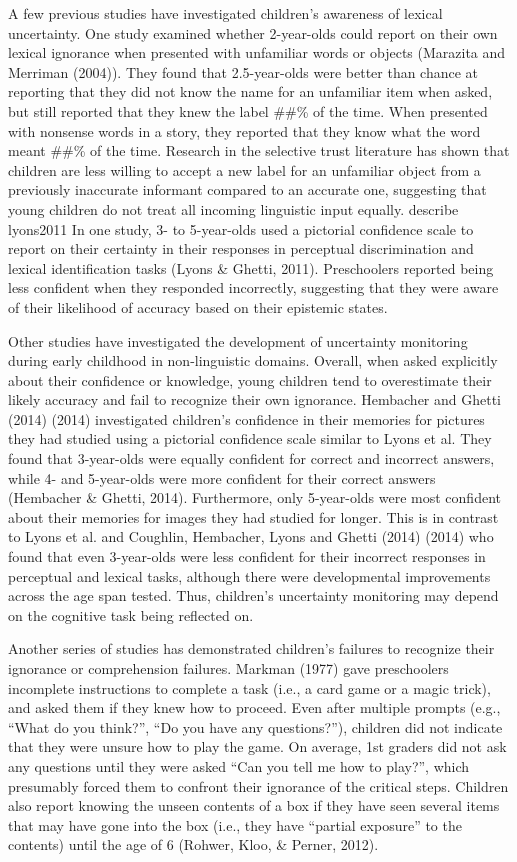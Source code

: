 \documentclass[english,man]{apa6}
\theoremstyle{definition}
\theoremstyle{definition}
\theoremstyle{definition}
\theoremstyle{remark}
\begin{document}
A few previous studies have investigated children's awareness of lexical
uncertainty. One study examined whether 2-year-olds could report on
their own lexical ignorance when presented with unfamiliar words or
objects (Marazita and Merriman (2004)). They found that 2.5-year-olds
were better than chance at reporting that they did not know the name for
an unfamiliar item when asked, but still reported that they knew the
label \#\#\% of the time. When presented with nonsense words in a story,
they reported that they know what the word meant \#\#\% of the time.
Research in the selective trust literature has shown that children are
less willing to accept a new label for an unfamiliar object from a
previously inaccurate informant compared to an accurate one, suggesting
that young children do not treat all incoming linguistic input equally.
describe lyons2011 In one study, 3- to 5-year-olds used a pictorial
confidence scale to report on their certainty in their responses in
perceptual discrimination and lexical identification tasks (Lyons \&
Ghetti, 2011). Preschoolers reported being less confident when they
responded incorrectly, suggesting that they were aware of their
likelihood of accuracy based on their epistemic states.

Other studies have investigated the development of uncertainty
monitoring during early childhood in non-linguistic domains. Overall,
when asked explicitly about their confidence or knowledge, young
children tend to overestimate their likely accuracy and fail to
recognize their own ignorance. Hembacher and Ghetti (2014) (2014)
investigated children's confidence in their memories for pictures they
had studied using a pictorial confidence scale similar to Lyons et al.
They found that 3-year-olds were equally confident for correct and
incorrect answers, while 4- and 5-year-olds were more confident for
their correct answers (Hembacher \& Ghetti, 2014). Furthermore, only
5-year-olds were most confident about their memories for images they had
studied for longer. This is in contrast to Lyons et al. and Coughlin,
Hembacher, Lyons and Ghetti (2014) (2014) who found that even
3-year-olds were less confident for their incorrect responses in
perceptual and lexical tasks, although there were developmental
improvements across the age span tested. Thus, children's uncertainty
monitoring may depend on the cognitive task being reflected on.

Another series of studies has demonstrated children's failures to
recognize their ignorance or comprehension failures. Markman (1977) gave
preschoolers incomplete instructions to complete a task (i.e., a card
game or a magic trick), and asked them if they knew how to proceed. Even
after multiple prompts (e.g., \enquote{What do you think?}, \enquote{Do
you have any questions?}), children did not indicate that they were
unsure how to play the game. On average, 1st graders did not ask any
questions until they were asked \enquote{Can you tell me how to play?},
which presumably forced them to confront their ignorance of the critical
steps. Children also report knowing the unseen contents of a box if they
have seen several items that may have gone into the box (i.e., they have
\enquote{partial exposure} to the contents) until the age of 6 (Rohwer,
Kloo, \& Perner, 2012).
\end{document}
